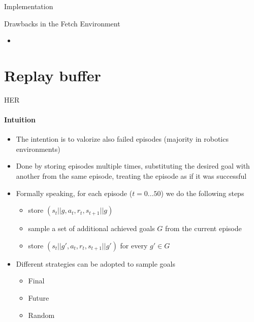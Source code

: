 \documentclass{beamer}
\begin{document}
      \begin{frame}{Implementation}
      \end{frame}

      \begin{frame}{Drawbacks in the Fetch Environment}
            \begin{itemize}
                  \item 
            \end{itemize}
      \end{frame}


\section{Replay buffer}

      \begin{frame}[fragile]{HER}
            \framesubtitle{Intuition}
            \begin{itemize}
                  \item The intention is to valorize also failed episodes (majority in robotics environments)
                  \item Done by storing episodes multiple times, substituting the desired goal with another from the same episode, treating the episode as if it was successful
                  \item Formally speaking, for each episode ($t = 0 ... 50$) we do the following steps
                        \begin{itemize}
                              \item store $\left( s_t||g, a_t, r_t, s_{t+1}||g\right)$
                              \item sample a set of additional achieved goals $G$ from the current episode
                              \item store $\left( s_t||g', a_t, r_t, s_{t+1}||g'\right)$ for every $g' \in G$
                        \end{itemize}
                  \item Different strategies can be adopted to sample goals
                        \begin{itemize}
                              \item Final
                              \item Future
                              \item Random
                        \end{itemize}
            \end{itemize}
      \end{frame}
\end{document}
